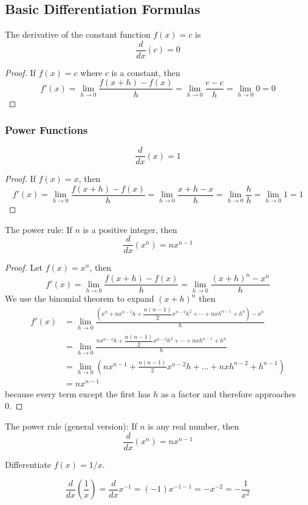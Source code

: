 \subsection{Basic Differentiation Formulas}

The derivative of the constant function \(f(x)=c\) is
\[\frac{d}{dx}(c)=0\]
\begin{proof}
    If \(f(x)=c\) where \(c\) is a constant, then
    \[f'(x)=\lim_{h\to 0}\frac{f(x+h)-f(x)}{h}
    =\lim_{h\to 0}\frac{c-c}{h}=\lim_{h\to 0}0=0\]
\end{proof}

\subsubsection*{Power Functions}
\[\frac{d}{dx}(x)=1\]
\begin{proof}
    If \(f(x)=x\), then
    \[f'(x)=\lim_{h\to 0}\frac{f(x+h)-f(x)}{h}=\lim_{h\to 0}\frac{x+h-x}{h}
    =\lim_{h\to 0}\frac{h}{h}=\lim_{h\to 0}1=1\]
\end{proof}
The power rule:
If \(n\) is a positive integer, then
\[\frac{d}{dx}(x^n)=nx^{n-1}\]
\begin{proof}
    Let \(f(x)=x^n\), then
    \[f'(x)=\lim_{h\to 0}\frac{f(x+h)-f(x)}{h}
    =\lim_{h\to 0}\frac{(x+h)^n-x^n}{h}\]
    We use the binomial theorem to expand \((x+h)^n\) then
    \begin{align*}
        f'(x)
        &= \lim_{h\to 0}
        \frac{
            \left(x^n+nx^{n-1}h+\dfrac{n(n-1)}{2}x^{n-2}h^2+\cdots+nxh^{n-1}
            +h^n\right)-x^n}{h} \\
        &= \lim_{h\to 0}
        \frac{
            nx^{n-1}h+\dfrac{n(n-1)}{2}x^{n-2}h^2+\cdots+nxh^{n-1}+h^n}{h} \\
        &= \lim_{h\to 0}
        (nx^{n-1}+\frac{n(n-1)}{2}x^{n-2}h+\dots+nxh^{n-2}+h^{n-1}) \\
        &= nx^{n-1}
    \end{align*}
    because every term except the first has \(h\) as a factor and therefore
    approaches 0.
\end{proof}
The power rule (general version):
If \(n\) is any real number, then
\[\frac{d}{dx}(x^n)=nx^{n-1}\]
\begin{problem}
    Differentiate \(f(x)=1/x\).
\end{problem}
\begin{solution}
    \[\frac{d}{dx}\left(\frac{1}{x}\right)=\frac{d}{dx}x^{-1}=(-1)x^{-1-1}
    =-x^{-2}=-\frac{1}{x^2}\]
\end{solution}
